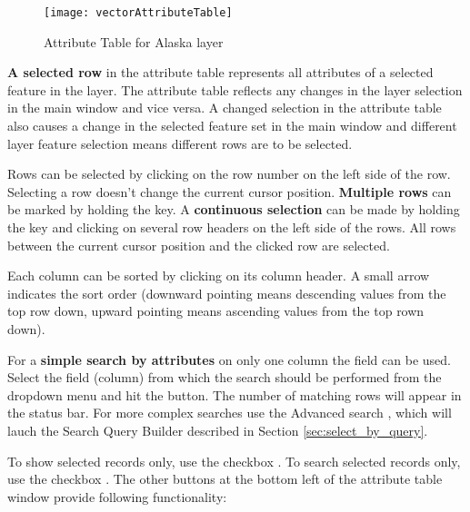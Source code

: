 \begin{figure}[ht]
   \centering
   \texttt{[image: vectorAttributeTable]}
   \caption{Attribute Table for Alaska layer \nixcaption}\label{fig:attributetable}
\end{figure}


\textbf{A selected row} in the attribute table represents all attributes of a
selected feature in the layer. The attribute table reflects any changes
in the layer selection in the main window and vice versa. A changed selection
in the attribute table also causes a change in the selected feature set in the
main window and different layer feature selection means different rows are to be
selected.

Rows can be selected by clicking on the row number on the left side of the
row. Selecting a row doesn't change the current cursor position. \textbf{Multiple
rows} can be marked by holding the  key. A \textbf{continuous
selection} can be made by holding the  key and clicking on several
row headers on the left side of the rows. All rows between the current cursor
position and the clicked row are selected.

Each column can be sorted by clicking on its column header. A small arrow
indicates the sort order (downward pointing means descending values from the top
row down, upward pointing means ascending values from the top rown down).

For a \textbf{simple search by attributes} on only one column the 
field can be used. Select the field (column) from which the search should be
performed from the dropdown menu and hit the  button. The number of
matching rows will appear in the status bar. For more complex searches use
the Advanced search , which will lauch the Search Query Builder
described in Section \ref{sec:select_by_query}.

To show selected records only, use the checkbox . To search selected records only, use the checkbox . The other buttons at the bottom left of the attribute table window provide following functionality:

